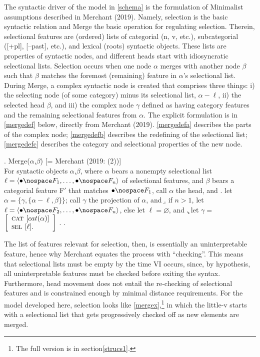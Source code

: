 \documentclass[12pt]{article}
\begin{document}
The syntactic driver of the model in \ref{schema} is the formulation of Minimalist assumptions described in Merchant (2019). Namely, selection is the basic syntactic relation and Merge the basic operation for regulating selection. Therein, selectional features are (ordered) lists of categorial (n, v, etc.), subcategorial ([+pl], [--past], etc.), and lexical (roots) syntactic objects. These lists are properties of syntactic nodes, and different heads start with idiosyncratic selectional lists. Selection occurs when one node $\alpha$ merges with another node $\beta$ such that $\beta$ matches the foremost (remaining) feature in $\alpha$'s selectional list. During Merge, a complex syntactic node is created that comprises three things: i) the selecting node (of some category) minus its selectional list, $\alpha-\ell$, ii) the selected head $\beta$, and iii) the complex node $\gamma$ defined as having category features and the remaining selectional features from $\alpha$. The explicit formulation is in \ref{mergedef} below, directly from Merchant (2019). \ref{mergedefa} describes the parts of the complex node; \ref{mergedefb} describes the redefining of the selectional list; \ref{mergedefc} describes the category and selectional properties of the new node.

\singlespacing

\ex. \label{mergedef} Merge($\alpha$,$\beta$) \hfill [= Merchant (2019: (2))]\\
For syntactic objects $\alpha$,$\beta$, where $\alpha$ bears a nonempty selectional list $\ell = \langle\bullet\nospace F_1,\ldots,\bullet\nospace F_n\rangle$ of selectional features, and $\beta$ bears a categorial feature F$'$ that matches $\bullet\nospace F_1$, call $\alpha$ the head, and
\a. \label{mergedefa} let $\alpha = \{\gamma,\{\alpha-\ell,\beta\}\}$; call $\gamma$ the projection of $\alpha$, and
\b. \label{mergedefb} if $n > 1$, let $\ell = \langle\bullet\nospace F_2,\ldots,\bullet\nospace F_n\rangle$, else let $\ell = \varnothing$, and
\c. \label{mergedefc} let $\gamma = $
\begin{math}
  \left[
    \begin{array}{l}
      \textsc{cat\space}[cat(\alpha)] \\
      \textsc{sel\space} \space [\ell].
    \end{array}
  \right]
\end{math}
\z. \z. \par

\doublespacing


The list of features relevant for selection, then, is essentially an uninterpretable feature, hence why Merchant equates the process with ``checking''. This means that selectional lists must be empty by the time VI occurs, since, by hypothesis, all uninterpretable features must be checked before exiting the syntax. Furthermore, head movement does not entail the re-checking of selectional features and is constrained enough by minimal distance requirements. For the model developed here, selection looks like \ref{mergex},\footnote{ The full version is in section\ref{strucs1}.} in which the little-v starts with a selectional list that gets progressively checked off as new elements are merged.
\end{document}
